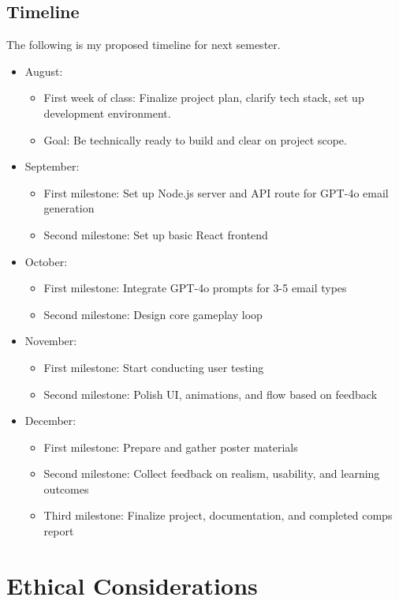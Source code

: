 \documentclass[10pt,twocolumn]{article}
\begin{document}
\subsection{Timeline}
The following is my proposed timeline for next semester.
\begin{itemize}
  \item August:
    \begin{itemize}
        \item First week of class: Finalize project plan, clarify tech stack, set up development environment.
        \item Goal: Be technically ready to build and clear on project scope.
    \end{itemize}
    \item September:
    \begin{itemize}
        \item First milestone: Set up Node.js server and API route for GPT-4o email generation
        \item Second milestone: Set up basic React frontend
    \end{itemize}
    \item October:
    \begin{itemize}
        \item First milestone: Integrate GPT-4o prompts for 3-5 email types 
        \item Second milestone: Design core gameplay loop 
    \end{itemize}
    \item November:
    \begin{itemize}
        \item First milestone: Start conducting user testing 
        \item Second milestone: Polish UI, animations, and flow based on feedback
    \end{itemize}
    \item December:
    \begin{itemize}
        \item First milestone: Prepare and gather poster materials
        \item Second milestone: Collect feedback on realism, usability, and learning outcomes
        \item Third milestone: Finalize project, documentation, and completed comps report
    \end{itemize}
\end{itemize}

\section{Ethical Considerations}
\end{document}
